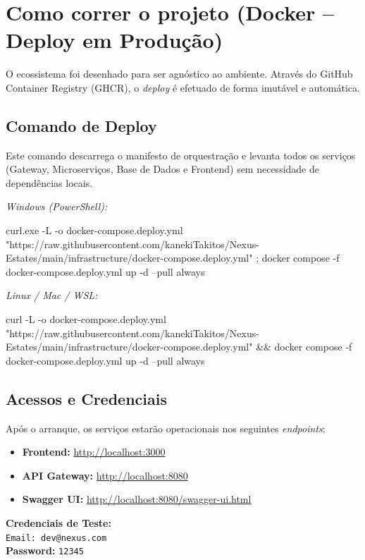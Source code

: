\newpage
\section{Como correr o projeto (Docker -- Deploy em Produção)}

O ecossistema foi desenhado para ser agnóstico ao ambiente. Através do GitHub Container Registry (GHCR), o \textit{deploy} é efetuado de forma imutável e automática.

\subsection{Comando de Deploy}
Este comando descarrega o manifesto de orquestração e levanta todos os serviços (Gateway, Microserviços, Base de Dados e Frontend) sem necessidade de dependências locais.



\textit{Windows (PowerShell):}
\begin{codeblock}
curl.exe -L -o docker-compose.deploy.yml "https://raw.githubusercontent.com/kanekiTakitos/Nexus-Estates/main/infrastructure/docker-compose.deploy.yml" ; docker compose -f docker-compose.deploy.yml up -d --pull always
\end{codeblock}




\textit{Linux / Mac / WSL:}
\begin{codeblock}
curl -L -o docker-compose.deploy.yml "https://raw.githubusercontent.com/kanekiTakitos/Nexus-Estates/main/infrastructure/docker-compose.deploy.yml" && docker compose -f docker-compose.deploy.yml up -d --pull always
\end{codeblock}


\subsection{Acessos e Credenciais}
Após o arranque, os serviços estarão operacionais nos seguintes \textit{endpoints}:

\begin{itemize}[label=\textbullet, noitemsep]
    \item \textbf{Frontend:} \url{http://localhost:3000}
    \item \textbf{API Gateway:} \url{http://localhost:8080}
    \item \textbf{Swagger UI:} \url{http://localhost:8080/swagger-ui.html}
\end{itemize}

\textbf{Credenciais de Teste:} \\
\texttt{Email: dev@nexus.com} \\
\textbf{Password:} \texttt{12345}

